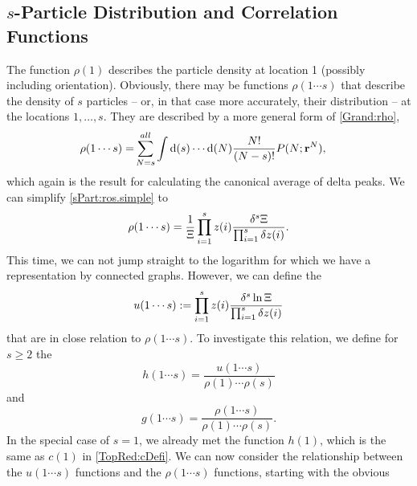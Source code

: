 \documentclass[8.5pt,twoside,twocolumn]{article}
\newcommand\di{\te{d}}
\renewcommand\r{\bo r}
\theoremstyle{standard}
\begin{document}
\newcommand\os{1,\ldots,s}
\newcommand\ros{\rho(1\cdots s)}
\newcommand\uos{u(1\cdots s)}
\subsection{$s$-Particle Distribution and Correlation Functions}
\label{MCE:sPart} 
The function $\rho(1)$ describes the particle density at location 1 (possibly including
orientation). Obviously, there may be functions $\ros$ that describe the density of
$s$ particles -- or, in that case more accurately, their distribution -- at the
locations $\os$. They are described by a more general form of \eqref{Grand:rho},
\begin{equation}
\begin{aligned}
\ros%
=&\sum_{N=s}^{\infty} \int\di(s)\cdots\di(N) \frac{N!}{(N-s)!}P(N;\r^N),
\end{aligned}
\label{sPart:ros.simple}
\end{equation}
which again is the result for calculating the canonical average of delta peaks. We can simplify
\eqref{sPart:ros.simple} to
\begin{equation}
\ros=\frac 1 \Xi \prod_{i=1}^s z(i) \frac{\dl^s\Xi}{\prod_{i=1}^s \dl z(i)}.
\label{sPart:ros.byXi}
\end{equation} 
This time, we can not jump straight to the logarithm for which we have a representation by connected
graphs. However, we can define the  
\begin{equation}
\uos:=\prod_{i=1}^s z(i) \frac{\dl^s \ln \Xi}{\prod_{i=1}^s \dl z(i)}
\end{equation}
that are in close relation to $\ros$. To investigate this relation, we
define for $s \ge 2$ the 
\newcommand\g{g(12)}
\renewcommand\h{h(12)}
\begin{equation}
h(1\cdots s)=\frac{\uos}{\rho(1)\cdots\rho(s)}
\label{sPart:hsimple}
\end{equation}
and
\begin{equation}
g(1\cdots s)=\frac{\ros}{\rho(1)\cdots\rho(s)}.
\label{sPart:gsimple}
\end{equation}
In the special case of $s=1$, we already met the function $h(1)$, which is the
same as $c(1)$ in \eqref{TopRed:cDefi}. We can now consider the relationship
between the $\uos$ functions and the $\ros$ functions, starting with the obvious
\end{document}
